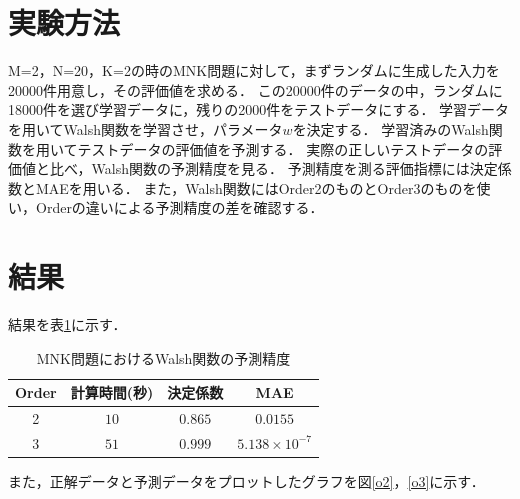 \documentclass[main]{subfiles}
\begin{document}
        \section{実験方法}
        M=2，N=20，K=2の時のMNK問題に対して，まずランダムに生成した入力を20000件用意し，その評価値を求める．
        この20000件のデータの中，ランダムに18000件を選び学習データに，残りの2000件をテストデータにする．
        学習データを用いてWalsh関数を学習させ，パラメータ$w$を決定する．
        学習済みのWalsh関数を用いてテストデータの評価値を予測する．
        実際の正しいテストデータの評価値と比べ，Walsh関数の予測精度を見る．
        予測精度を測る評価指標には決定係数とMAEを用いる．
        また，Walsh関数にはOrder2のものとOrder3のものを使い，Orderの違いによる予測精度の差を確認する．

        \section{結果}
        結果を表\ref{mnk_result}に示す．
        \begin{table}[h]
            \centering
            \caption{MNK問題におけるWalsh関数の予測精度}
            \begin{tabular}{c|ccc}
              Order & 計算時間(秒) & 決定係数 & MAE\\ \hline
              2 & $10$ & $0.865$ & $0.0155$ \\
              3 & $51$ & $0.999$ & $5.138 \times 10^{-7}$ \\
            \end{tabular}
            \label{mnk_result}
        \end{table}
        また，正解データと予測データをプロットしたグラフを図\ref{o2}，\ref{o3}に示す．
\end{document}
